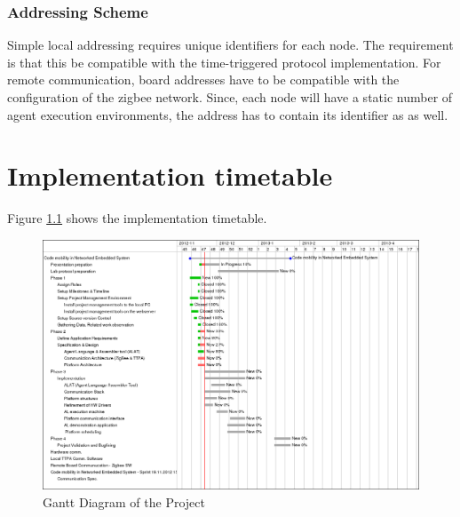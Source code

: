 \documentclass{scrreprt}
\begin{document}
\subsection{Addressing Scheme}
Simple local addressing requires unique identifiers for
each node. The requirement is that this be compatible with the time-triggered protocol
implementation. For remote communication, board addresses have to be compatible
with the configuration of the zigbee network. Since, each node will have a static 
number of agent execution environments, the address has to contain its
identifier as as well.  

\chapter{Implementation timetable}

Figure \ref{fig:ganttdiag} shows the implementation timetable.

\begin{figure}[!htb]
\centering
\includegraphics[scale=0.4]{figures/gantt.png}
\caption{Gantt Diagram of the Project}
\label{fig:ganttdiag}
\end{figure}
\end{document}
